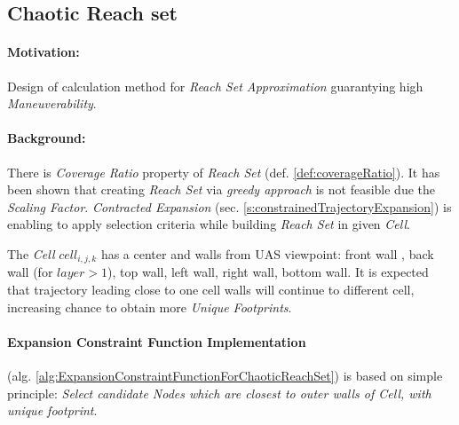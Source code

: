 
\subsection{Chaotic Reach set}\label{s:chaoticReachSet}

\paragraph{Motivation:} Design of calculation method for \emph{Reach Set Approximation} guarantying high \emph{Maneuverability}.

\paragraph{Background:}There is \emph{Coverage Ratio} property of \emph{Reach Set} (def. \ref{def:coverageRatio}). It has been shown that creating \emph{Reach Set} via \emph{greedy approach} is not feasible due the \emph{Scaling Factor}.  \emph{Contracted Expansion} (sec. \ref{s:constrainedTrajectoryExpansion}) is enabling to apply selection criteria while building \emph{Reach Set} in given \emph{Cell}. 

The \emph{Cell} $cell_{i,j,k}$ has a center and walls from UAS viewpoint: front wall , back wall (for $layer > 1$), top wall, left wall, right wall, bottom wall. It is expected that trajectory leading close to one cell walls will continue to different cell, increasing chance to obtain more \emph{Unique Footprints}. 

\paragraph{Expansion Constraint Function Implementation} (alg. \ref{alg:ExpansionConstraintFunctionForChaoticReachSet}) is based on simple principle: \emph{Select candidate Nodes which are  closest to outer walls of Cell, with unique footprint}.

